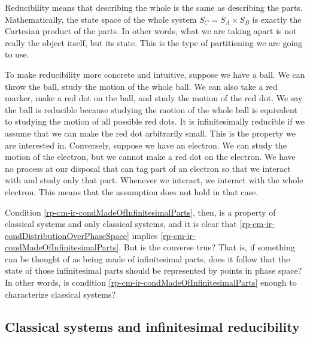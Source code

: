 Reducibility means that describing the whole is the same as describing the parts. Mathematically, the state space of the whole system $S_C = S_A \times S_B$ is exactly the Cartesian product of the parts. In other words, what we are taking apart is not really the object itself, but its state. This is the type of partitioning we are going to use.

To make reducibility more concrete and intuitive, suppose we have a ball. We can throw the ball, study the motion of the whole ball. We can also take a red marker, make a red dot on the ball, and study the motion of the red dot. We say the ball is reducible because studying the motion of the whole ball is equivalent to studying the motion of all possible red dots. It is infinitesimally reducible if we assume that we can make the red dot arbitrarily small. This is the property we are interested in. Conversely, suppose we have an electron. We can study the motion of the electron, but we cannot make a red dot on the electron. We have no process at our disposal that can tag part of an electron so that we interact with and study only that part. Whenever we interact, we interact with the whole electron. This means that the assumption does not hold in that case.

Condition \ref{rp-cm-ir-condMadeOfInfinitesimalParts}, then, is a property of classical systems and only classical systems, and it is clear that \ref{rp-cm-ir-condDistributionOverPhaseSpace} implies \ref{rp-cm-ir-condMadeOfInfinitesimalParts}. But is the converse true? That is, if something can be thought of as being made of infinitesimal parts, does it follow that the state of those infinitesimal parts should be represented by points in phase space? In other words, is condition \ref{rp-cm-ir-condMadeOfInfinitesimalParts} enough to characterize classical systems?


\subsection{Classical systems and infinitesimal reducibility}

